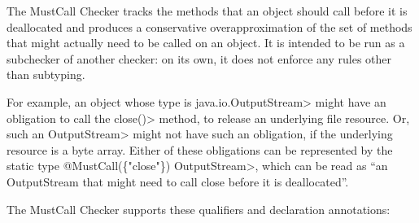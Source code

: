 \htmlhr
{}

The MustCall Checker tracks the methods that an object should call before it is deallocated
and produces a conservative overapproximation of the set of methods that might
actually need to be called on an object.
It is intended to be run as a subchecker of another checker: on its own, it does not
enforce any rules other than subtyping.

For example, an object whose type is \<java.io.OutputStream> might
have an obligation to call the \<close()> method, to release an underlying file resource. Or,
such an \<OutputStream> might not have such an obligation, if the underlying resource is
a byte array. Either of these obligations can be represented by the static type
\<@MustCall(\{"close"\}) OutputStream>, which can be read as ``an OutputStream that might need
to call close before it is deallocated''.


The MustCall Checker supports these qualifiers and declaration annotations:

